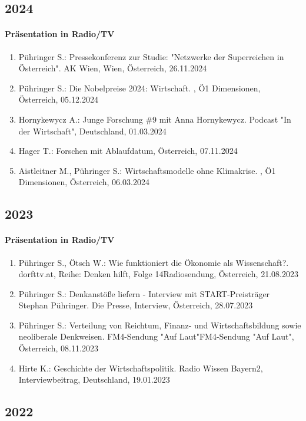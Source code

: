 \subsection*{2024}
\paragraph{Präsentation in Radio/TV}
\begin{enumerate}
	\item Pühringer S.: Pressekonferenz zur Studie: "Netzwerke der Superreichen in Österreich". AK Wien, Wien, Österreich, 26.11.2024
	\item Pühringer S.: Die Nobelpreise 2024: Wirtschaft. , Ö1 Dimensionen, Österreich, 05.12.2024
	\item Hornykewycz A.: Junge Forschung \#9 mit Anna Hornykewycz. Podcast "In der Wirtschaft", Deutschland, 01.03.2024
	\item Hager T.: Forschen mit Ablaufdatum, Österreich, 07.11.2024
	\item Aistleitner M., Pühringer S.: Wirtschaftsmodelle ohne Klimakrise. , Ö1 Dimensionen, Österreich, 06.03.2024
\end{enumerate}
\subsection*{2023}
\paragraph{Präsentation in Radio/TV}
\begin{enumerate}
	\item Pühringer S., Ötsch W.: Wie funktioniert die Ökonomie als Wissenschaft?. dorfttv.at, Reihe: Denken hilft, Folge 14Radiosendung, Österreich, 21.08.2023
	\item Pühringer S.: Denkanstöße liefern - Interview mit START-Preisträger Stephan Pühringer. Die Presse, Interview, Österreich, 28.07.2023
	\item Pühringer S.: Verteilung von Reichtum, Finanz- und Wirtschaftsbildung sowie neoliberale Denkweisen. FM4-Sendung "Auf Laut"FM4-Sendung "Auf Laut", Österreich, 08.11.2023
	\item Hirte K.: Geschichte der Wirtschaftspolitik. Radio Wissen Bayern2, Interviewbeitrag, Deutschland, 19.01.2023
\end{enumerate}
\subsection*{2022}
